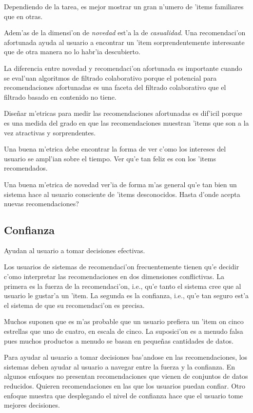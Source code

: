 \documentclass[11pt]{article}
\begin{document}
Dependiendo de la tarea, es mejor mostrar un gran n'umero de 'items familiares que en otras.

Adem'as de la dimensi'on de \textit{novedad} est'a la de \textit{casualidad}. Una recomendaci'on afortunada ayuda al usuario a encontrar un 'item sorprendentemente interesante que de otra manera no lo habr'ia descubierto.

La diferencia entre novedad y recomendaci'on afortunada es importante cuando se eval'uan algoritmos de filtrado colaborativo porque el potencial para recomendaciones afortunadas es una faceta del filtrado colaborativo que el filtrado basado en contenido no tiene.

Dise\~{n}ar m'etricas para medir las recomendaciones afortunadas es dif'icil porque es una medida del grado en que las recomendaciones muestran 'items que son a la vez atractivas y sorprendentes.

Una buena m'etrica debe encontrar la forma de ver c'omo los intereses del usuario se ampl'ian sobre el tiempo. Ver qu'e tan feliz es con los 'items recomendados. 

Una buena m'etrica de novedad ver'ia de forma m'as general qu'e tan bien un sistema hace al usuario consciente de 'items desconocidos. Hasta d'onde acepta nuevas recomendaciones?

\subsection{Confianza}
Ayudan al usuario a tomar decisiones efectivas.

Los usuarios de sistemas de recomendaci'on frecuentemente tienen qu'e decidir c'omo interpretar las recomendaciones en dos dimensiones conflictivas. La primera es la fuerza de la recomendaci'on, i.e., qu'e tanto el sistema cree que al usuario le gustar'a un 'item. La segunda es la confianza, i.e., qu'e tan seguro est'a el sistema de que su recomendaci'on es precisa.

Muchos suponen que es m'as probable que un usuario prefiera un 'item on cinco estrellas  que uno de cuatro, en escala de cinco. La suposici'on es a menudo falsa pues muchos productos a menudo se basan en peque\~{n}as cantidades de datos.

Para ayudar al usuario a tomar decisiones bas'andose en las recomendaciones, los sistemas deben ayudar al usuario a navegar entre la fuerza y la confianza. En algunos enfoques no presentan recomendaciones que vienen de conjuntos de datos reducidos. Quieren recomendaciones en las que los usuarios puedan confiar. Otro enfoque muestra que desplegando el nivel de confianza hace que el usuario tome mejores decisiones. 
\end{document}
